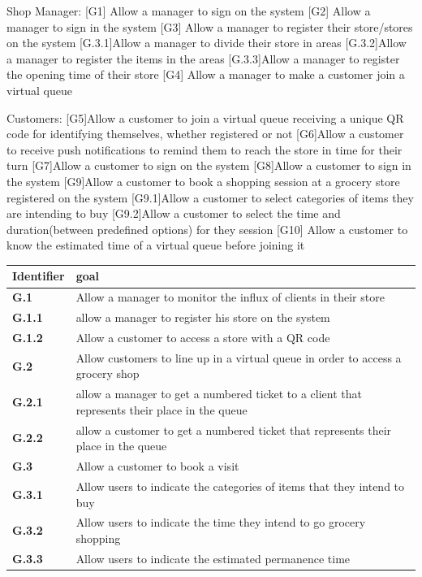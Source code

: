 Shop Manager:
[G1] Allow a manager to sign on the system
[G2] Allow a manager to sign in the system
[G3] Allow a manager to register their store/stores on the system
	[G.3.1]Allow a manager to divide their store in areas	
	[G.3.2]Allow a manager to register the items in the areas
	[G.3.3]Allow a manager to register the opening time of their 
		store
[G4] Allow a manager to make a customer join a virtual queue

Customers:
[G5]Allow a customer to join a virtual queue receiving a unique QR code for identifying themselves, whether registered or not
[G6]Allow a customer to receive push notifications to remind them to reach the store in time for their turn
[G7]Allow a customer to sign on the system
[G8]Allow a customer to sign in the system
[G9]Allow a customer to book a shopping session at a grocery store registered on the system
	[G9.1]Allow a customer to select categories of items they are 		intending to 
	buy
	[G9.2]Allow a customer to select the time and duration(between 		predefined options) for they session 	
[G10] Allow a customer to know the estimated time of a virtual queue before		joining it

\begin{tabular}{|l|l|}
    \hline
    \textbf{Identifier} & \textbf{goal}\\
    \hline
    \textbf{G.1} & Allow a manager to monitor the influx of clients in their store\\
    \textbf{G.1.1} & allow a manager to register his store on the system\\
    \textbf{G.1.2} & Allow a customer to access a store with a QR code\\
    \hline
    \textbf{G.2} & Allow customers to line up in a virtual queue in order to access a grocery shop\\
    \textbf{G.2.1} & allow a manager to get a numbered ticket to a client that represents their place in the queue\\
    \textbf{G.2.2} & allow a customer to get a numbered ticket that represents their place in the queue\\
    \hline
    \textbf{G.3} & Allow a customer to book a visit\\
    \textbf{G.3.1} & Allow users to indicate the categories of items that they intend to buy\\
    \textbf{G.3.2} & Allow users to indicate the time they intend to go grocery shopping\\
    \textbf{G.3.3} & Allow users to indicate the estimated permanence time \\
    \hline
\end{tabular}


